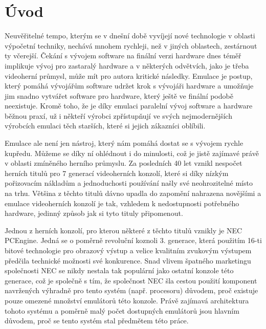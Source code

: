
\chapter{Úvod}\label{chap:intro}

Neuvěřitelné tempo, kterým se v dnešní době vyvíjejí nové technologie v oblasti
výpočetní techniky, nechává mnohem rychleji, než v jiných oblastech, zestárnout
ty včerejší. Čekání s vývojem software na finální verzi hardware dnes téměř
implikuje vývoj pro zastaralý hardware a v některých odvětvích, jako je třeba
videoherní průmysl, může mít pro autora kritické následky. Emulace je postup,
který pomáhá vývojářům software udržet krok s vývojáři hardware a umožňuje jim
snadno vytvářet software pro hardware, který ještě ve finální podobě
neexistuje. Kromě toho, že je díky emulaci paralelní vývoj software a hardware
běžnou praxí, už i někteří výrobci zpřístupňují ve svých nejmodernějších
výrobcích emulaci těch starších, které si jejich zákazníci
oblíbili.

Emulace ale není jen nástroj, který nám pomáhá dostat se s vývojem rychle
kupředu. Můžeme se díky ní ohlédnout i do minulosti, což je jistě zajímavé
právě v oblasti zmíněného herního průmyslu. Za posledních 40 let vznikl
nespočet herních titulů pro 7 generací videoherních konzolí, které si díky
nízkým pořizovacím nákladům a jednoduchosti používání našly své neohrozitelné
místo na trhu. Většina z těchto titulů dávno upadla do zapomění nahrazena
novějšími a emulace videoherních konzolí je tak, vzhledem k nedostupnosti
potřebného hardware, jedinný způsob jak si tyto tituly připomenout.

Jednou z herních konzolí, pro kterou některé z těchto titulů vznikly je NEC
PCEngine. Jedná se o poměrně revoluční koznoli 3. generace, která použitím
16-ti bitové technologie pro obrazový výstup a velice kvalitním zvukovým
výstupem předčila technické možnosti své konkurence. Snad vlivem špatného
marketingu společnosti NEC se nikdy nestala tak populární jako ostatní konzole
této generace, což je společně s tím, že společnost NEC šla cestou použití
komponent navržených výhradně pro tento systém (např. procesoru)
důvodem, proč existuje pouze omezené množství emulátorů této konzole. Právě
zajímavá architektura tohoto systému a poměrně malý počet dostupných emulátorů
jsou hlavním důvodem, proč se tento systém stal předmětem této práce.

